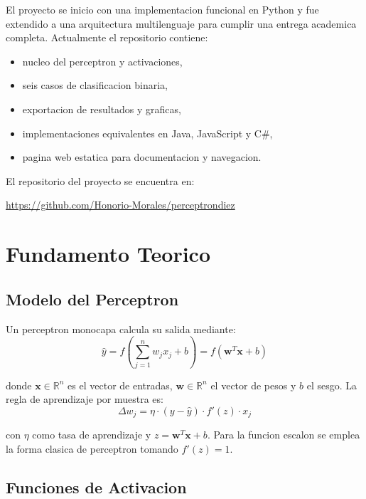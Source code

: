 \documentclass[10pt,twocolumn,a4paper]{article}
\begin{document}
El proyecto se inicio con una implementacion funcional en Python y fue
extendido a una arquitectura multilenguaje para cumplir una entrega
academica completa. Actualmente el repositorio contiene:
\begin{itemize}
  \item nucleo del perceptron y activaciones,
  \item seis casos de clasificacion binaria,
  \item exportacion de resultados y graficas,
  \item implementaciones equivalentes en Java, JavaScript y C\#,
  \item pagina web estatica para documentacion y navegacion.
\end{itemize}

El repositorio del proyecto se encuentra en:
\begin{center}
\small\url{https://github.com/Honorio-Morales/perceptrondiez}
\end{center}

\section{Fundamento Teorico}

\subsection{Modelo del Perceptron}

Un perceptron monocapa calcula su salida mediante:
\begin{equation}
  \hat{y} = f\!\left(\sum_{j=1}^{n} w_j x_j + b\right) = f(\mathbf{w}^T\mathbf{x} + b)
\end{equation}

\noindent donde $\mathbf{x} \in \mathbb{R}^n$ es el vector de
entradas, $\mathbf{w} \in \mathbb{R}^n$ el vector de pesos y $b$ el
sesgo. La regla de aprendizaje por muestra es:
\begin{equation}
  \Delta w_j = \eta \cdot (y - \hat{y}) \cdot f'(z) \cdot x_j
\end{equation}

\noindent con $\eta$ como tasa de aprendizaje y
$z = \mathbf{w}^T\mathbf{x} + b$. Para la funcion escalon se emplea
la forma clasica de perceptron tomando $f'(z)=1$.

\subsection{Funciones de Activacion}
\end{document}
